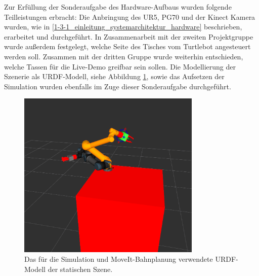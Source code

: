 Zur Erfüllung der Sonderaufgabe des Hardware-Aufbaus wurden folgende Teilleistungen erbracht:
\newline
Die Anbringung des UR5, PG70 und der Kinect Kamera wurden, wie in \ref{1-3-1_einleitung_systemarchitektur_hardware} beschrieben, erarbeitet und durchgeführt. In Zusammenarbeit mit der zweiten Projektgruppe wurde außerdem festgelegt, welche Seite des Tisches vom Turtlebot angesteuert werden soll. Zusammen mit der dritten Gruppe wurde weiterhin entschieden, welche Tassen für die Live-Demo greifbar sein sollen. Die Modellierung der Szenerie als URDF-Modell, siehe Abbildung \ref{urdfModell}, sowie das Aufsetzen der Simulation wurden ebenfalls im Zuge dieser Sonderaufgabe durchgeführt.
\begin{figure}
	\centering
	\includegraphics[height=8cm]{images/Modell.png}
	\caption{Das für die Simulation und MoveIt-Bahnplanung verwendete URDF-Modell der statischen Szene.}
	\label{urdfModell}
\end{figure}
